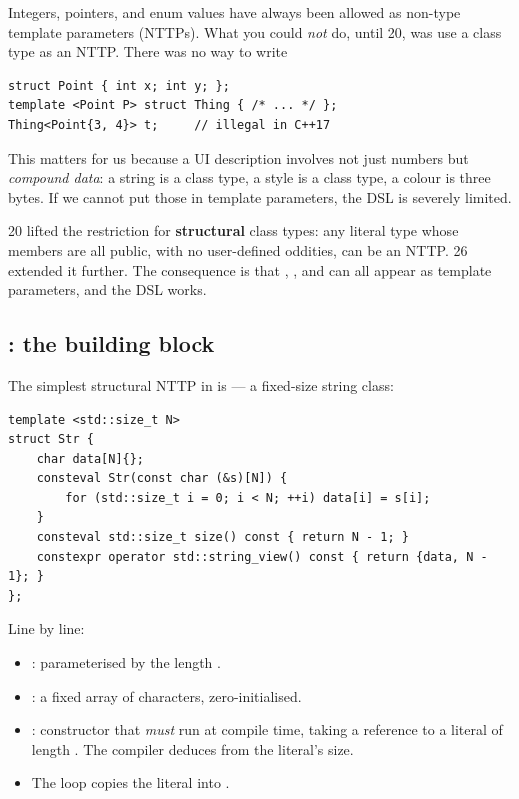 Integers, pointers, and enum values have always been allowed as
non-type template parameters (NTTPs). What you could \emph{not} do,
until \cpp{}20, was use a class type as an NTTP. There was no way to
write

\begin{lstlisting}
struct Point { int x; int y; };
template <Point P> struct Thing { /* ... */ };
Thing<Point{3, 4}> t;     // illegal in C++17
\end{lstlisting}

This matters for us because a UI description involves not just
numbers but \emph{compound data}: a string is a class type, a style
is a class type, a colour is three bytes. If we cannot put those in
template parameters, the DSL is severely limited.

\cpp{}20 lifted the restriction for \textbf{structural} class types:
any literal type whose members are all public, with no user-defined
oddities, can be an NTTP. \cpp{}26 extended it further. The
consequence is that , ,
and  can all appear as template parameters,
and the DSL works.

\subsection{: the building block}

The simplest structural NTTP in \maya{} is  ---
a fixed-size string class:

\begin{lstlisting}
template <std::size_t N>
struct Str {
    char data[N]{};
    consteval Str(const char (&s)[N]) {
        for (std::size_t i = 0; i < N; ++i) data[i] = s[i];
    }
    consteval std::size_t size() const { return N - 1; }
    constexpr operator std::string_view() const { return {data, N - 1}; }
};
\end{lstlisting}

Line by line:

\begin{itemize}[leftmargin=*]
  \item {}: parameterised
    by the length .
  \item {}: a fixed array of 
    characters, zero-initialised.
  \item {}: constructor that
    \emph{must} run at compile time, taking a reference to a
     literal of length . The compiler deduces
     from the literal's size.
  \item The loop copies the literal into .
\end{itemize}

